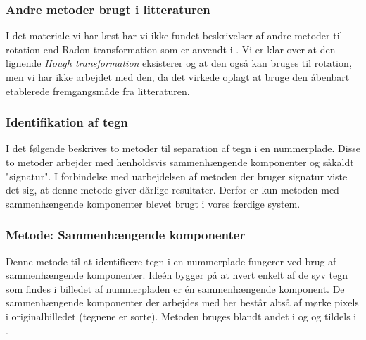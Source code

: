 \subsubsection*{Andre metoder brugt i litteraturen}
I det materiale vi har læst har vi ikke fundet beskrivelser af andre metoder til rotation end Radon transformation som er anvendt i \cite{sharpiro}. Vi er klar over at den lignende \textit{Hough transformation} eksisterer og at den også kan bruges til rotation, men vi har ikke arbejdet med den, da det virkede oplagt at bruge den åbenbart etablerede fremgangsmåde fra litteraturen. 

\subsubsection{Identifikation af tegn}




I det følgende beskrives to metoder til separation af tegn i en nummerplade. Disse to metoder arbejder med henholdsvis sammenhængende komponenter og såkaldt "signatur". I forbindelse med uarbejdelsen af metoden der bruger signatur viste det sig, at denne metode giver dårlige resultater. Derfor er kun metoden med sammenhængende komponenter blevet brugt i vores færdige system.


\subsubsection*{Metode: Sammenhængende komponenter}
Denne metode til at identificere tegn i en nummerplade fungerer ved brug af sammenhængende komponenter. Ideén bygger på at hvert enkelt af de syv tegn som findes i billedet af nummerpladen er én sammenhængende komponent. De sammenhængende komponenter der arbejdes med her består altså af mørke pixels i originalbilledet (tegnene er sorte). Metoden bruges blandt andet i \cite{nijhuis} og \cite{parker} og tildels i \cite{kwas}.

